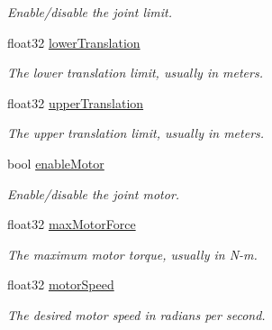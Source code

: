 \begin{DoxyCompactItemize}
\begin{DoxyCompactList}\small\item\em Enable/disable the joint limit. \end{DoxyCompactList}\item 
float32 \hyperlink{structb2_prismatic_joint_def_ac0a0e2a669d640ebea354895fe6a9fb6}{lower\+Translation}\hypertarget{structb2_prismatic_joint_def_ac0a0e2a669d640ebea354895fe6a9fb6}{}\label{structb2_prismatic_joint_def_ac0a0e2a669d640ebea354895fe6a9fb6}

\begin{DoxyCompactList}\small\item\em The lower translation limit, usually in meters. \end{DoxyCompactList}\item 
float32 \hyperlink{structb2_prismatic_joint_def_ae3eac123c7fe543071bdfcd1a6942350}{upper\+Translation}\hypertarget{structb2_prismatic_joint_def_ae3eac123c7fe543071bdfcd1a6942350}{}\label{structb2_prismatic_joint_def_ae3eac123c7fe543071bdfcd1a6942350}

\begin{DoxyCompactList}\small\item\em The upper translation limit, usually in meters. \end{DoxyCompactList}\item 
bool \hyperlink{structb2_prismatic_joint_def_a58ac79a54a8110d3a745e1d6d36990dc}{enable\+Motor}\hypertarget{structb2_prismatic_joint_def_a58ac79a54a8110d3a745e1d6d36990dc}{}\label{structb2_prismatic_joint_def_a58ac79a54a8110d3a745e1d6d36990dc}

\begin{DoxyCompactList}\small\item\em Enable/disable the joint motor. \end{DoxyCompactList}\item 
float32 \hyperlink{structb2_prismatic_joint_def_aabeec48af1e49c7f9fed5e0bc8270a1b}{max\+Motor\+Force}\hypertarget{structb2_prismatic_joint_def_aabeec48af1e49c7f9fed5e0bc8270a1b}{}\label{structb2_prismatic_joint_def_aabeec48af1e49c7f9fed5e0bc8270a1b}

\begin{DoxyCompactList}\small\item\em The maximum motor torque, usually in N-\/m. \end{DoxyCompactList}\item 
float32 \hyperlink{structb2_prismatic_joint_def_ac4bdaea15653657e724a04fc60f3f235}{motor\+Speed}\hypertarget{structb2_prismatic_joint_def_ac4bdaea15653657e724a04fc60f3f235}{}\label{structb2_prismatic_joint_def_ac4bdaea15653657e724a04fc60f3f235}

\begin{DoxyCompactList}\small\item\em The desired motor speed in radians per second. \end{DoxyCompactList}\end{DoxyCompactItemize}


